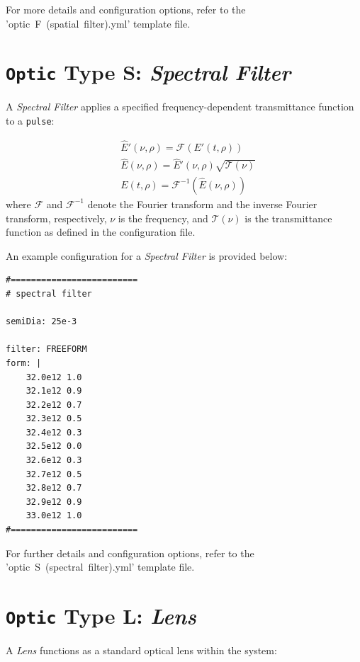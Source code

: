 \documentclass{report}
\begin{document}
For more details and configuration options, refer to the 'optic~F~(spatial~filter).yml' template file.


\section{\texttt{Optic} Type S: \textit{Spectral Filter}}
A \textit{Spectral Filter} applies a specified frequency-dependent transmittance function to a \texttt{pulse}:

\begin{equation}
 \begin{aligned}
  &\widehat{E}'(\nu,\rho) = \mathcal{F}(E'(t,\rho))\\
  &\widehat{E}(\nu,\rho) = \widehat{E}'(\nu,\rho) \sqrt{\mathcal{T}(\nu)}\\
  &E(t,\rho) = \mathcal{F}^{-1}(\widehat{E}(\nu,\rho))
 \end{aligned}
\end{equation}
where \( \mathcal{F} \) and \( \mathcal{F}^{-1} \) denote the Fourier transform and the inverse Fourier transform, respectively, \( \nu \) is the frequency, and \( \mathcal{T}(\nu) \) is the transmittance function as defined in the configuration file.

An example configuration for a \textit{Spectral Filter} is provided below:

\begin{verbatim}
#=========================
# spectral filter

semiDia: 25e-3

filter: FREEFORM
form: |
    32.0e12 1.0
    32.1e12 0.9
    32.2e12 0.7
    32.3e12 0.5
    32.4e12 0.3
    32.5e12 0.0
    32.6e12 0.3
    32.7e12 0.5
    32.8e12 0.7
    32.9e12 0.9
    33.0e12 1.0
#=========================
\end{verbatim}

For further details and configuration options, refer to the 'optic~S~(spectral~filter).yml' template file.



\section{\texttt{Optic} Type L: \textit{Lens}}
A \textit{Lens} functions as a standard optical lens within the system:
\end{document}
